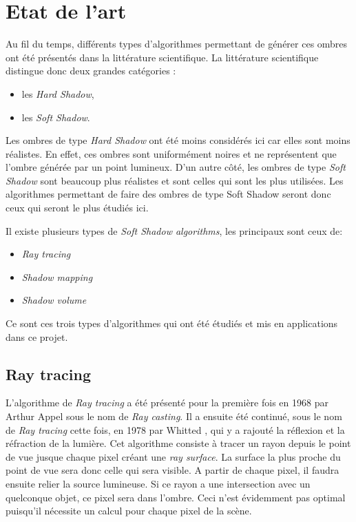 \documentclass[a4paper,10pt]{report}
\begin{document}
\chapter{Etat de l'art}

Au fil du temps, différents types d'algorithmes permettant de générer ces ombres ont été présentés dans la littérature scientifique. La littérature scientifique distingue donc deux grandes catégories : 
\begin{itemize}
\item les \textit{Hard Shadow},
\item les \textit{Soft Shadow}.
\end{itemize}
Les ombres de type \textit{Hard Shadow} ont été moins considérés ici car elles sont moins réalistes. En effet, ces ombres sont uniformément noires et ne représentent que l'ombre générée par un point lumineux. D'un autre côté, les ombres de type \textit{Soft Shadow} sont beaucoup plus réalistes et sont celles qui sont les plus utilisées. Les algorithmes permettant de faire des ombres de type Soft Shadow seront donc ceux qui seront le plus étudiés ici.

Il existe plusieurs types de \textit{Soft Shadow algorithms}, les principaux sont ceux de:
\begin{itemize}
\item{\textit{Ray tracing}}
\item{\textit{Shadow mapping}}
\item{\textit{Shadow volume}}
\end{itemize}

Ce sont ces trois types d'algorithmes qui ont été étudiés et mis en applications dans ce projet.

\section{Ray tracing}


L'algorithme de \textit{Ray tracing} a été présenté pour la première fois en 1968 par Arthur Appel\cite{appel1968some} sous le nom de \textit{Ray casting}. Il a ensuite été continué, sous le nom de \textit{Ray tracing} cette fois, en 1978 par Whitted \cite{whitted1978scan}, qui y a rajouté la réflexion et la réfraction de la lumière. 
Cet algorithme consiste à tracer un rayon depuis le point de vue jusque chaque pixel créant une \textit{ray surface}. La surface la plus proche du point de vue sera donc celle qui sera visible. A partir de chaque pixel, il faudra ensuite relier la source lumineuse. Si ce rayon a une intersection avec un quelconque objet, ce pixel sera dans l'ombre. Ceci n'est évidemment pas optimal puisqu'il nécessite un calcul pour chaque pixel de la scène.
\end{document}
